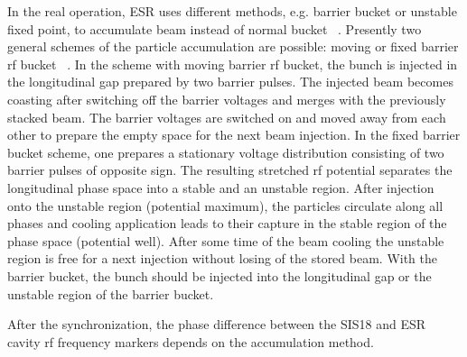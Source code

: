 In the real operation, ESR uses different methods, e.g. barrier bucket or unstable fixed point, to accumulate beam instead of normal bucket ~\cite{steck_demonstration_2011}.  Presently two general schemes of the particle accumulation are possible: moving or fixed barrier rf bucket ~\cite{smirnov_particle_2009}. In the scheme with moving barrier rf bucket, the bunch is injected in the longitudinal gap prepared by two barrier pulses. The injected beam becomes coasting after switching off the barrier voltages and merges with the previously stacked beam. The barrier voltages are switched on and moved away from each other to prepare the empty space for the next beam injection. In the fixed barrier bucket scheme, one prepares a stationary voltage distribution consisting of two barrier pulses of opposite sign. The resulting stretched rf potential separates the longitudinal phase space into a stable and an unstable region. After injection onto the unstable region (potential maximum), the particles circulate along all phases and cooling application leads to their capture in the stable region of the phase space (potential well). After some time of the beam cooling the unstable region is free for a next injection without losing of the stored beam. With the barrier bucket, the bunch should be injected into the longitudinal gap or the unstable region of the barrier bucket.

After the synchronization, the phase difference between the SIS18 and ESR cavity rf frequency markers depends on the accumulation method.

